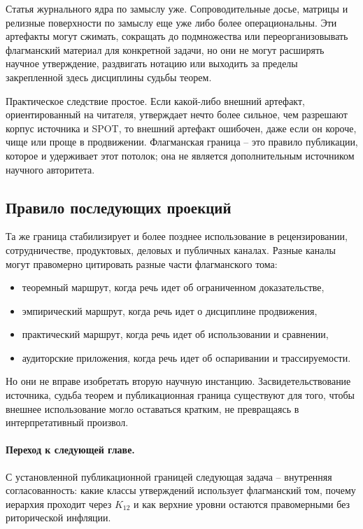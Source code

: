 Статья журнального ядра по замыслу уже. Сопроводительные досье, матрицы и
релизные поверхности по замыслу еще уже либо более операциональны. Эти
артефакты могут сжимать, сокращать до подмножества или переорганизовывать
флагманский материал для конкретной задачи, но они не могут расширять научное
утверждение, раздвигать нотацию или выходить за пределы закрепленной здесь
дисциплины судьбы теорем.

Практическое следствие простое. Если какой-либо внешний артефакт,
ориентированный на читателя, утверждает нечто более сильное, чем разрешают
корпус источника и SPOT, то внешний артефакт ошибочен, даже если он короче,
чище или проще в продвижении. Флагманская граница -- это правило публикации,
которое и удерживает этот потолок; она не является дополнительным источником
научного авторитета.

\subsection{Правило последующих проекций}

Та же граница стабилизирует и более позднее использование в рецензировании,
сотрудничестве, продуктовых, деловых и публичных каналах. Разные каналы могут
правомерно цитировать разные части флагманского тома:

\begin{itemize}
\item теоремный маршрут, когда речь идет об ограниченном доказательстве,
\item эмпирический маршрут, когда речь идет о дисциплине продвижения,
\item практический маршрут, когда речь идет об использовании и сравнении,
\item аудиторские приложения, когда речь идет об оспаривании и
      трассируемости.
\end{itemize}

Но они не вправе изобретать вторую научную инстанцию. Засвидетельствование
источника, судьба теорем и публикационная граница существуют для того, чтобы
внешнее использование могло оставаться кратким, не превращаясь в
интерпретативный произвол.

\paragraph{Переход к следующей главе.}
С установленной публикационной границей следующая задача -- внутренняя
согласованность: какие классы утверждений использует флагманский том, почему
иерархия проходит через \(K_{12}\) и как верхние уровни остаются правомерными
без риторической инфляции.

\clearpage

